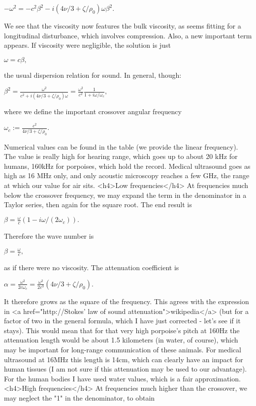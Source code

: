 $ -\omega^2 = - c^2\beta^2 - i (4\nu/3+\zeta/\rho_0)  \omega \beta^2.$

We see that the viscosity now features the bulk viscosity, as seems fitting for a longitudinal disturbance, which involves compression. Also, a new important term appears. If viscosity were negligible, the solution is just

$  \omega =  c \beta , $

the usual dispersion relation for sound. In general, though:

$ \beta^2 = \frac{\omega^2}{c^2+i(4\nu/3+\zeta/\rho_0)\omega}=\frac{\omega^2}{c^2}\frac{1}{1+ i\omega/\omega_c},$

where we define the important crossover angular frequency

$ \omega_c := \frac{c^2}{4\nu/3+\zeta/\rho_0}.$

Numerical values can be found in the table (we provide the linear frequency). The value is really high for hearing range, which goes up to about 20 kHz for humans, 160kHz for porpoises, which hold the record. Medical ultrasound goes as high as 16 MHz only, and only acoustic microscopy reaches a few GHz, the range at which our value for air sits.
<h4>Low frequencies</h4>
At frequencies much below the crossover frequency, we may expand the term in the denominator in a Taylor series, then again for the square root. The end result is

$ \beta = \frac{\omega}{c} (1-i   \omega/(2 \omega_c)).$

 

Therefore the wave number is

$ \beta = \frac{\omega}{c},$

as if there were no viscosity. The attenuation coefficient is

$ \alpha = \frac{\omega^2}{2 c\omega_c}=\frac{\omega^2}{2 c^3}(4\nu/3+\zeta/\rho_0). $

It therefore grows as the square of the frequency.  This agrees with the expression in <a href="http://Stokes' law of sound attenuation">wikipedia</a> (but for a factor of two in the general formula, which I have just corrected - let's see if it stays). This would mean that for that very high porpoise's pitch at 160Hz the attenuation length would be about 1.5 kilometers (in water, of course), which may be important for long-range communication of these animals. For medical ultrasound at 16MHz this length is 14cm, which can clearly have an impact for human tissues (I am not sure if this attenuation may be used to our advantage). For the human bodies I have used water values, which is a fair approximation.
<h4>High frequencies</h4>
At frequencies much higher than the crossover, we may neglect the "1" in the denominator, to obtain

